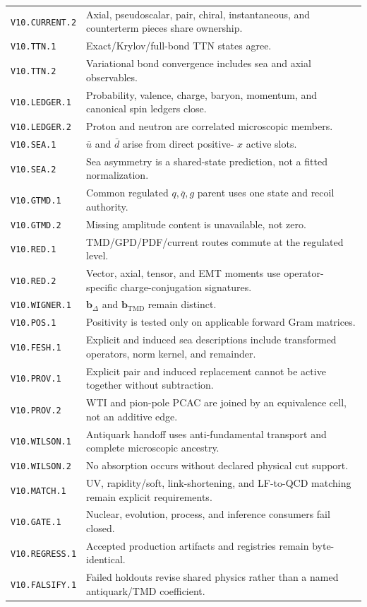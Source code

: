 \documentclass[11pt]{article}
\newcommand{\bD}{\bm{b}_{\Delta}}
\newcommand{\bM}{\bm{b}_{\mathrm{TMD}}}
\begin{document}
\begin{longtable}{L{0.23\textwidth}L{0.69\textwidth}}
\texttt{V10.CURRENT.2} & Axial, pseudoscalar, pair, chiral, instantaneous, and
counterterm pieces share ownership.\\
\texttt{V10.TTN.1} & Exact/Krylov/full-bond TTN states agree.\\
\texttt{V10.TTN.2} & Variational bond convergence includes sea and axial
observables.\\
\texttt{V10.LEDGER.1} & Probability, valence, charge, baryon, momentum, and
canonical spin ledgers close.\\
\texttt{V10.LEDGER.2} & Proton and neutron are correlated microscopic
members.\\
\texttt{V10.SEA.1} & \(\bar u\) and \(\bar d\) arise from direct positive-
\(x\) active slots.\\
\texttt{V10.SEA.2} & Sea asymmetry is a shared-state prediction, not a fitted
normalization.\\
\texttt{V10.GTMD.1} & Common regulated \(q,\bar q,g\) parent uses one state
and recoil authority.\\
\texttt{V10.GTMD.2} & Missing amplitude content is unavailable, not zero.\\
\texttt{V10.RED.1} & TMD/GPD/PDF/current routes commute at the regulated
level.\\
\texttt{V10.RED.2} & Vector, axial, tensor, and EMT moments use operator-
specific charge-conjugation signatures.\\
\texttt{V10.WIGNER.1} & \(\bD\) and \(\bM\) remain distinct.\\
\texttt{V10.POS.1} & Positivity is tested only on applicable forward Gram
matrices.\\
\texttt{V10.FESH.1} & Explicit and induced sea descriptions include
transformed operators, norm kernel, and remainder.\\
\texttt{V10.PROV.1} & Explicit pair and induced replacement cannot be active
together without subtraction.\\
\texttt{V10.PROV.2} & WTI and pion-pole PCAC are joined by an equivalence
cell, not an additive edge.\\
\texttt{V10.WILSON.1} & Antiquark handoff uses anti-fundamental transport and
complete microscopic ancestry.\\
\texttt{V10.WILSON.2} & No absorption occurs without declared physical cut
support.\\
\texttt{V10.MATCH.1} & UV, rapidity/soft, link-shortening, and LF-to-QCD
matching remain explicit requirements.\\
\texttt{V10.GATE.1} & Nuclear, evolution, process, and inference consumers
fail closed.\\
\texttt{V10.REGRESS.1} & Accepted production artifacts and registries remain
byte-identical.\\
\texttt{V10.FALSIFY.1} & Failed holdouts revise shared physics rather than a
named antiquark/TMD coefficient.\\
\bottomrule
\end{longtable}
\end{document}
